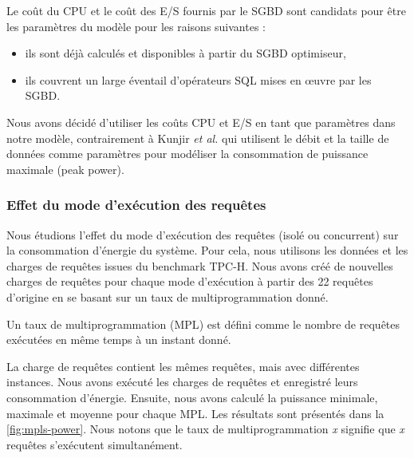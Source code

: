 Le coût du CPU et le coût des E/S fournis par le SGBD sont candidats pour être les paramètres du modèle pour les raisons suivantes :
\begin{itemize}
 \item ils sont déjà calculés et disponibles à partir du SGBD optimiseur,
 \item ils couvrent un large éventail d'opérateurs SQL mises en œuvre par les SGBD.
\end{itemize}
Nous avons décidé d'utiliser les coûts CPU et E/S en tant que paramètres dans notre modèle, contrairement à Kunjir \textit{et al.} \cite{Kunjir12} qui utilisent le débit et la taille de données comme paramètres pour modéliser la consommation de puissance maximale (peak power).%

\subsubsection{Effet du mode d'exécution des requêtes}
Nous étudions l'effet du mode d'exécution des requêtes (isolé ou concurrent) sur la consommation d'énergie du système. Pour cela, nous utilisons les données et les charges de requêtes issues du benchmark TPC-H. Nous avons créé de nouvelles charges de requêtes pour chaque mode d'exécution à partir des 22 requêtes d'origine en se basant sur un taux de multiprogrammation donné. 

\begin{definition}
Un taux de multiprogrammation (\gls{MPL}) est défini comme le nombre de requêtes exécutées en même temps à un instant donné.
\end{definition}
La charge de requêtes contient les mêmes requêtes, mais avec différentes instances. Nous avons exécuté les charges de requêtes et enregistré leurs consommation d'énergie. Ensuite, nous avons calculé la puissance minimale, maximale et moyenne pour chaque MPL. Les résultats sont présentés dans la \ref{fig:mpls-power}. Nous notons que le taux de multiprogrammation \textit{x} signifie que \textit{x} requêtes s'exécutent simultanément.

